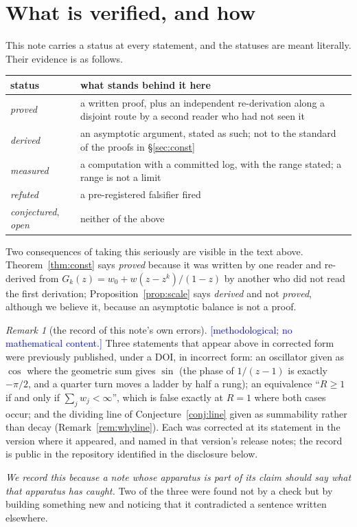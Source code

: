 \documentclass[11pt,a4paper]{article}
\theoremstyle{plain}
\theoremstyle{definition}
\theoremstyle{remark}
\newtheorem{remark}[theorem]{Remark}
\newcommand{\STATUS}[1]{\textcolor{blue}{\textsf{[#1]}}}
\begin{document}
\section{What is verified, and how}\label{sec:verified}

This note carries a status at every statement, and the statuses are meant literally.
Their evidence is as follows.

\begin{center}
\begin{tabular}{ll}
\toprule
status & what stands behind it here\\
\midrule
\emph{proved} & a written proof, plus an independent re-derivation along a disjoint
  route by a second reader who had not seen it\\
\emph{derived} & an asymptotic argument, stated as such; not to the standard of the
  proofs in \S\ref{sec:const}\\
\emph{measured} & a computation with a committed log, with the range stated; a range is
  not a limit\\
\emph{refuted} & a pre-registered falsifier fired\\
\emph{conjectured}, \emph{open} & neither of the above\\
\bottomrule
\end{tabular}
\end{center}

Two consequences of taking this seriously are visible in the text above.
Theorem~\ref{thm:const} says \emph{proved} because it was written by one reader and
re-derived from $G_k(z)=w_0+w(z-z^{k})/(1-z)$ by another who did not read the first
derivation; Proposition~\ref{prop:scale} says \emph{derived} and not \emph{proved},
although we believe it, because an asymptotic balance is not a proof.

\begin{remark}[the record of this note's own errors]\label{rem:ourerrors}
\STATUS{methodological; no mathematical content.}
Three statements that appear above in corrected form were previously published, under a
DOI, in incorrect form: an oscillator given as $\cos$ where the geometric sum gives
$\sin$ (the phase of $1/(z-1)$ is exactly $-\pi/2$, and a quarter turn moves a ladder by
half a rung); an equivalence ``$R\ge1$ if and only if $\sum_jw_j<\infty$'', which is false
exactly at $R=1$ where both cases occur; and the dividing line of
Conjecture~\ref{conj:line} given as summability rather than decay
(Remark~\ref{rem:whyline}). Each was corrected at its statement in the version where it
appeared, and named in that version's release notes; the record is public in the
repository identified in the disclosure below.

\emph{We record this because a note whose apparatus is part of its claim should say what
that apparatus has caught.} Two of the three were found not by a check but by building
something new and noticing that it contradicted a sentence written elsewhere.
\end{remark}
\end{document}
